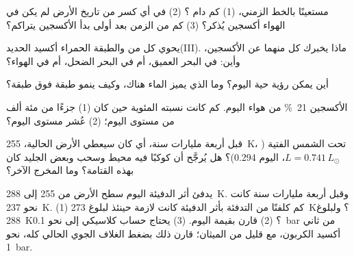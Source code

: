 \begin{exercise}[$\star\star$]\label{exo:g12:early-earth:8}
مستعينًا بالخط الزمني، (1) كم دام ؟ (2)
في أي كسر من تاريخ الأرض لم يكن في الهواء أكسجين يُذكر؟
(3) كم من الزمن بعد أولى  بدأ الأكسجين يتراكم؟
\end{exercise}

\begin{exercise}[$\star\star$]\label{exo:g12:early-earth:9}
يحوي كل من  والطبقة الحمراء أكسيد الحديد(III). ماذا
يخبرك كل منهما عن الأكسجين، وأين: في البحر العميق، أم في البحر
الضحل، أم في الهواء؟
\end{exercise}

\begin{exercise}[$\star\star$]\label{exo:g12:early-earth:10}
أين يمكن رؤية  حية اليوم؟ وما الذي يميز
الماء هناك، وكيف ينمو  طبقة فوق طبقة؟
\end{exercise}

\begin{exercise}[$\star\star$]\label{exo:g12:early-earth:11}
الأكسجين \qty{21}{\percent} من هواء اليوم. كم كانت نسبته المئوية حين
كان (1) جزءًا من مئة ألف من مستوى اليوم؛ (2) عُشر مستوى اليوم؟
\end{exercise}

\begin{exercise}[$\star\star\star$]\label{exo:g12:early-earth:12}
قبل أربعة مليارات سنة، أي  كان سيعطي الأرض 
الحالية، \qty{255}{K}، تحت الشمس الفتية ($L = 0.741\,L_\odot$،
 اليوم 0.294)؟ هل يُرجَّح أن كوكبًا فيه محيط وسحب وبعض الجليد
كان بهذه القتامة؟ وما المخرج الآخر؟
\end{exercise}

\begin{exercise}[$\star\star\star$]\label{exo:g12:early-earth:13}
يدفئ أثر الدفيئة اليوم سطح الأرض من 255 إلى
\qty{288}{K}. وقبل أربعة مليارات سنة كانت  نحو
\qty{237}{K}. (1) كم كلفنًا من التدفئة بأثر الدفيئة كانت لازمة حينئذ
لبلوغ \qty{273}{K}؟ ولبلوغ \qty{288}{K}؟ (2) قارن بقيمة اليوم.
(3) يحتاج حساب كلاسيكي إلى نحو \qty{0.1}{bar} من ثاني أكسيد الكربون،
مع قليل من الميثان؛ قارن ذلك بضغط الغلاف الجوي الحالي كله،
نحو \qty{1}{bar}.
\end{exercise}

